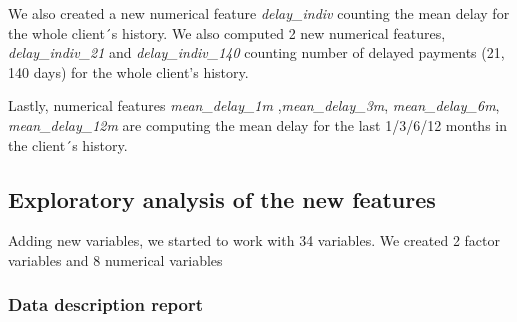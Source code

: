 \documentclass[
]{article}
\begin{document}
We also created a new numerical feature \emph{delay\_indiv} counting the mean delay for the whole client´s history. We also computed 2 new numerical features, \emph{delay\_indiv\_21} and \emph{delay\_indiv\_140} counting number of delayed payments (21, 140 days) for the whole client's history.

Lastly, numerical features \emph{mean\_delay\_1m} ,\emph{mean\_delay\_3m}, \emph{mean\_delay\_6m}, \emph{mean\_delay\_12m} are computing the mean delay for the last 1/3/6/12 months in the client´s history.

\hypertarget{exploratory-analysis-of-the-new-features}{%
\subsection{Exploratory analysis of the new features}\label{exploratory-analysis-of-the-new-features}}

Adding new variables, we started to work with 34 variables. We created
2 factor variables and 8 numerical variables

\hypertarget{data-description-report-1}{%
\subsubsection{Data description report}\label{data-description-report-1}}
\end{document}
